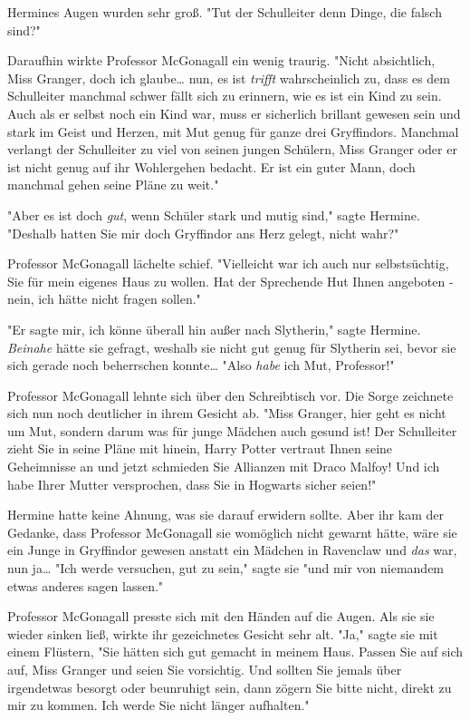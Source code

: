 {Hermines Augen wurden sehr groß. "Tut der Schulleiter denn Dinge, die falsch sind?"

Daraufhin wirkte Professor McGonagall ein wenig traurig. "Nicht absichtlich, Miss Granger, doch ich glaube… nun, es ist \emph{trifft} wahrscheinlich zu, dass es dem Schulleiter manchmal schwer fällt sich zu erinnern, wie es ist ein Kind zu sein. Auch als er selbst noch ein Kind war, muss er sicherlich brillant gewesen sein und stark im Geist und Herzen, mit Mut genug für ganze drei Gryffindors. Manchmal verlangt der Schulleiter zu viel von seinen jungen Schülern, Miss Granger oder er ist nicht genug auf ihr Wohlergehen bedacht. Er ist ein guter Mann, doch manchmal gehen seine Pläne zu weit."

"Aber es ist doch \emph{gut}, wenn Schüler stark und mutig sind," sagte Hermine. "Deshalb hatten Sie mir doch Gryffindor ans Herz gelegt, nicht wahr?"

Professor McGonagall lächelte schief. "Vielleicht war ich auch nur selbstsüchtig, Sie für mein eigenes Haus zu wollen. Hat der Sprechende Hut Ihnen angeboten - nein, ich hätte nicht fragen sollen."

"Er sagte mir, ich könne überall hin außer nach Slytherin," sagte Hermine. \emph{Beinahe} hätte sie gefragt, weshalb sie nicht gut genug für Slytherin sei, bevor sie sich gerade noch beherrschen konnte… "Also \emph{habe} ich Mut, Professor!"

Professor McGonagall lehnte sich über den Schreibtisch vor. Die Sorge zeichnete sich nun noch deutlicher in ihrem Gesicht ab. "Miss Granger, hier geht es nicht um Mut, sondern darum was für junge Mädchen auch gesund ist! Der Schulleiter zieht Sie in seine Pläne mit hinein, Harry Potter vertraut Ihnen seine Geheimnisse an und jetzt schmieden Sie Allianzen mit Draco Malfoy! Und ich habe Ihrer Mutter versprochen, dass Sie in Hogwarts sicher seien!"

Hermine hatte keine Ahnung, was sie darauf erwidern sollte. Aber ihr kam der Gedanke, dass Professor McGonagall sie womöglich nicht gewarnt hätte, wäre sie ein Junge in Gryffindor gewesen anstatt ein Mädchen in Ravenclaw und \emph{das} war, nun ja… "Ich werde versuchen, gut zu sein," sagte sie "und mir von niemandem etwas anderes sagen lassen."

Professor McGonagall presste sich mit den Händen auf die Augen. Als sie sie wieder sinken ließ, wirkte ihr gezeichnetes Gesicht sehr alt. "Ja," sagte sie mit einem Flüstern, "Sie hätten sich gut gemacht in meinem Haus. Passen Sie auf sich auf, Miss Granger und seien Sie vorsichtig. Und sollten Sie jemals über irgendetwas besorgt oder beunruhigt sein, dann zögern Sie bitte nicht, direkt zu mir zu kommen. Ich werde Sie nicht länger aufhalten."

}
